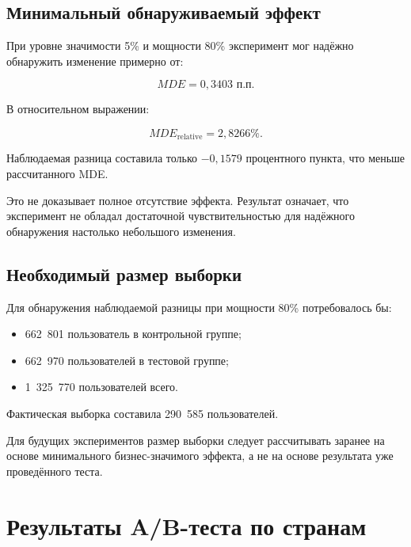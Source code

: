 \documentclass[12pt,a4paper]{extarticle}
\begin{document}
\newpage
\subsection{Минимальный обнаруживаемый эффект}

При уровне значимости 5\% и мощности 80\% эксперимент мог надёжно
обнаружить изменение примерно от:

\[
MDE = 0{,}3403
\text{ п.п.}
\]

В относительном выражении:

\[
MDE_{\text{relative}}
=
2{,}8266\%.
\]

Наблюдаемая разница составила только \(-0{,}1579\) процентного пункта,
что меньше рассчитанного MDE.

Это не доказывает полное отсутствие эффекта. Результат означает,
что эксперимент не обладал достаточной чувствительностью для
надёжного обнаружения настолько небольшого изменения.

\subsection{Необходимый размер выборки}

Для обнаружения наблюдаемой разницы при мощности 80\% потребовалось бы:

\begin{itemize}
    \item 662~801 пользователь в контрольной группе;
    \item 662~970 пользователей в тестовой группе;
    \item 1~325~770 пользователей всего.
\end{itemize}

Фактическая выборка составила 290~585 пользователей.

Для будущих экспериментов размер выборки следует рассчитывать заранее
на основе минимального бизнес-значимого эффекта, а не на основе
результата уже проведённого теста.

\newpage
\section{Результаты A/B-теста по странам}
\end{document}
